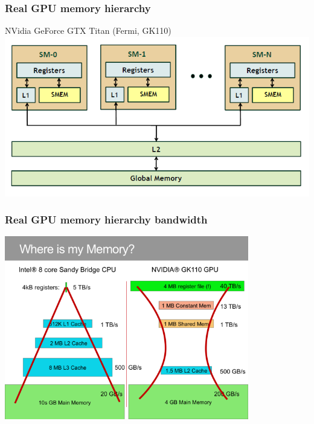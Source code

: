 \documentclass{beamer}
\begin{document}
            \begin{frame}
                \frametitle{Real GPU memory hierarchy}
                NVidia GeForce GTX Titan (Fermi, GK110)
                \includegraphics[width=\textwidth]{Fermi_memory_hierarchy.png}
            \end{frame}
            
            \begin{frame}
                \frametitle{Real GPU memory hierarchy bandwidth}
                \includegraphics[width=0.8\textwidth]{Fermi_memory_hierarchy_speed_size.png}
            \end{frame}
\end{document}
